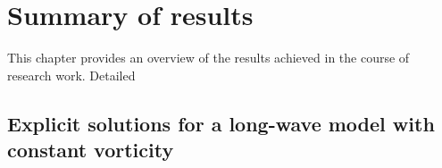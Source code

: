 \chapter{Summary of results}

This chapter provides an overview of the results achieved in the course of research work. 
Detailed 
















\section{Explicit solutions for a long-wave model with constant vorticity}
